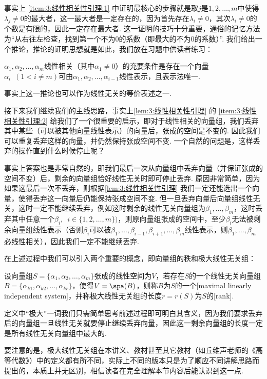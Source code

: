 事实上 \ref*{item:3:线性相关性引理:1} 中证明最核心的步骤就是取$j$是$1,2,\ldots,m$中使得$\lambda_j\neq 0$的最大者，这一最大者是一定存在的，因为首先存在$\lambda_i\neq 0$，其次$\lambda_i\neq 0$的个数是有限的，因此一定存在最大者. 这一证明的技巧十分重要，通俗的记忆方法为``从右往左检查，找到第一个不为0的系数（即最大的不为0的系数）''. 我们给出一个推论，推论的证明思想就是如此，我们放在习题中供读者练习：
\begin{corollary}
    $\alpha_1,\alpha_2,\ldots,\alpha_m$线性相关（其中$\alpha_1\neq 0$）的充要条件是存在一个向量$\alpha_i\enspace(1<i\neq m)$可由$\alpha_1,\alpha_2,\ldots,\alpha_{i-1}$线性表示，且表示法唯一.
\end{corollary}
事实上这一推论也可以作为线性无关的等价表述之一.

接下来我们继续我们的主线思路，事实上\autoref{lem:3:线性相关性引理} 的 \ref*{item:3:线性相关性引理:2} 给我们了一个很重要的启示，即对于线性相关的向量组，我们丢弃其中某些（可以被其他向量线性表示）的向量后，张成的空间是不变的. 因此我们可以重复丢弃这样的向量，并仍然保持张成空间不变. 一个自然的问题是，这样丢弃的操作直到什么时候停止呢？

事实上答案也是非常自然的，即我们最后一次从向量组中丢弃向量（并保证张成的空间不变）后，剩余的向量组恰好线性无关时即可停止丢弃. 原因非常简单，因为如果这最后一次不丢弃，则根据\autoref{lem:3:线性相关性引理} 我们一定还能选出一个向量，使得丢弃这一向量后仍能保持张成空间不变. 但一旦丢弃向量后向量组线性无关，这时一定不能继续丢弃，例如这时剩余的线性无关向量组为$\beta_1,\ldots,\beta_m$，这时丢弃其中任意一个$\beta_i,\enspace i\in\{1,2,\ldots,m\})$，则原向量组张成的空间中，至少$\beta_i$无法被剩余向量组线性表示（否则$\beta_i$可以被$\beta_1,\ldots,\beta_{i-1},\beta_{i+1},\ldots,\beta_m$线性表示，则$\beta_1,\ldots,\beta_m$必线性相关），因此我们一定不能继续丢弃.

在上述过程中我们可以引入两个重要的概念，即向量组的秩和极大线性无关组：
\begin{definition}
    设向量组$S=\{\alpha_1,\alpha_2,\ldots,\alpha_m\}$张成的线性空间为$V$，若存在$S$的一个线性无关向量组$B=\{\alpha_{k1},\alpha_{k2},\ldots,\alpha_{kr}\}$，使得$V=\spa(B)$，则称$B$为$S$的一个[maximal linearly independent system]，并称极大线性无关组的长度$r=r(S)$为$S$的[rank].
\end{definition}
定义中``极大''一词我们只需简单思考前述过程即可明白其含义，因为我们要求丢弃后的向量组一旦线性无关就要停止继续丢弃向量，因此这一剩余向量组的长度一定是所有线性无关向量组中最大的.

要注意的是，极大线性无关组在本讲义、教材甚至其它教材（如丘维声老师的《高等代数》）中的定义都有所不同，实际上不同的版本只是为了顺应不同讲解思路而提出的，本质上并无区别，相信读者在完全理解本节内容后能认识到这一点.


